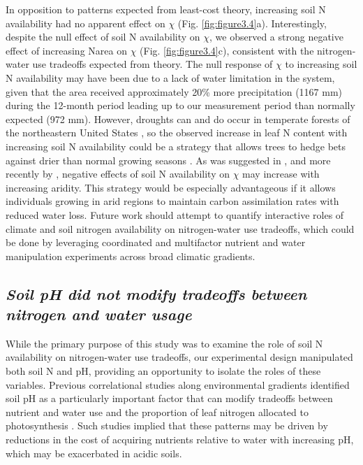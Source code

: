 In opposition to patterns expected from least-cost theory, increasing soil N availability had no apparent effect on $\chi$ (Fig. \ref{fig:figure3.4}a). Interestingly, despite the null effect of soil N availability on $\chi$, we observed a strong negative effect of increasing Narea on $\chi$ (Fig. \ref{fig:figure3.4}c), consistent with the nitrogen-water use tradeoffs expected from theory. The null response of $\chi$ to increasing soil N availability may have been due to a lack of water limitation in the system, given that the area received approximately 20\% more precipitation (1167 mm) during the 12-month period leading up to our measurement period than normally expected (972 mm). However, droughts can and do occur in temperate forests of the northeastern United States , so the observed increase in leaf N content with increasing soil N availability could be a strategy that allows trees to hedge bets against drier than normal growing seasons . As was suggested in , and more recently by , negative effects of soil N availability on $\chi$ may increase with increasing aridity. This strategy would be especially advantageous if it allows individuals growing in arid regions to maintain carbon assimilation rates with reduced water loss. Future work should attempt to quantify interactive roles of climate and soil nitrogen availability on nitrogen-water use tradeoffs, which could be done by leveraging coordinated and multifactor nutrient  and water  manipulation experiments across broad climatic gradients.
    
\subsection{\textit{Soil pH did not modify tradeoffs between nitrogen and water usage}}
While the primary purpose of this study was to examine the role of soil N availability on nitrogen-water use tradeoffs, our experimental design manipulated both soil N and pH, providing an opportunity to isolate the roles of these variables. Previous correlational studies along environmental gradients identified soil pH as a particularly important factor that can modify tradeoffs between nutrient and water use  and the proportion of leaf nitrogen allocated to photosynthesis . Such studies implied that these patterns may be driven by reductions in the cost of acquiring nutrients relative to water with increasing pH, which may be exacerbated in acidic soils.

